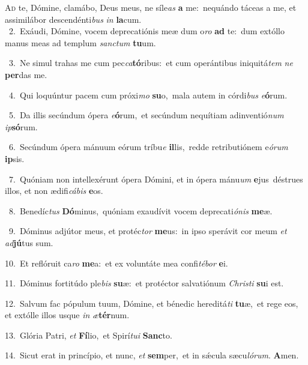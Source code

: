 \lettrine{\initial\textcolor{\initialcolor}{A}}{d} te, Dómine, clamábo, Deus meus, ne síle\textit{as} \textbf{a} me:~\star nequándo táceas a me, et assimilábor descendénti\textit{bus} \textit{in} \textbf{la}\-cum.\\
{\numbfont\textcolor{\numbcolor}{~2.}}~Exáudi, Dómine, vocem deprecatiónis meæ dum o\textit{ro} \textbf{ad} te:~\star dum extóllo manus meas ad templum \textit{sanc}\-\textit{tum} \textbf{tu}\-um.\par
{\numbfont\textcolor{\numbcolor}{~3.}}~Ne simul trahas me cum pec\-\textit{ca}\-\textbf{tó}ribus:~\star et cum operántibus iniquitá\textit{tem} \textit{ne} \textbf{per}\-das me.\par
{\numbfont\textcolor{\numbcolor}{~4.}}~Qui loquúntur pacem cum próxi\textit{mo} \textbf{su}\-o,~\star mala autem in córdi\textit{bus} \textit{e}\-\textbf{ó}rum.\par
{\numbfont\textcolor{\numbcolor}{~5.}}~Da illis secúndum ópera \textit{e}\-\textbf{ó}rum,~\star et secúndum nequítiam adinventió\textit{num} \textit{ip}\-\textbf{só}rum.\par
{\numbfont\textcolor{\numbcolor}{~6.}}~Secúndum ópera mánuum eórum tríbu\textit{e} \textbf{il}\-lis,~\star redde retributiónem e\-\textit{ó}\-\textit{rum} \textbf{ip}\-sis.\par
{\numbfont\textcolor{\numbcolor}{~7.}}~Quóniam non intellexérunt ópera Dómini, et in ópera mánu\textit{um} \textbf{e}\-jus~\star déstrues illos, et non ædifi\-\textit{cá}\-\textit{bis} \textbf{e}\-os.\par
{\numbfont\textcolor{\numbcolor}{~8.}}~Benedíc\textit{tus} \textbf{Dó}\-minus,~\star quóniam exaudívit vocem deprecati\-\textit{ó}\-\textit{nis} \textbf{me}\-æ.\par
{\numbfont\textcolor{\numbcolor}{~9.}}~Dóminus adjútor meus, et protéc\textit{tor} \textbf{me}\-us:~\star in ipso sperávit cor meum \textit{et} \textit{ad}\-\textbf{jú}tus sum.\par
{\numbfont\textcolor{\numbcolor}{10.}}~Et reflóruit ca\textit{ro} \textbf{me}\-a:~\star et ex voluntáte mea confi\-\textit{té}\-\textit{bor} \textbf{e}\-i.\par
{\numbfont\textcolor{\numbcolor}{11.}}~Dóminus fortitúdo ple\textit{bis} \textbf{su}\-æ:~\star et protéctor salvatiónum \textit{Chris}\-\textit{ti} \textbf{su}\-i est.\par
{\numbfont\textcolor{\numbcolor}{12.}}~Salvum fac pópulum tuum, Dómine, et bénedic hereditá\textit{ti} \textbf{tu}\-æ,~\star et rege eos, et extólle illos usque \textit{in} \textit{æ}\-\textbf{tér}num.\par
{\numbfont\textcolor{\numbcolor}{13.}}~Glória Patri, \textit{et} \textbf{Fí}\-lio,~\star et Spirí\-\textit{tu}\-\textit{i} \textbf{Sanc}\-to.\par
{\numbfont\textcolor{\numbcolor}{14.}}~Sicut erat in princípio, et nunc, \textit{et} \textbf{sem}\-per,~\star et in sǽcula sæcu\-\textit{ló}\-\textit{rum}. \textbf{A}\-men.\par
